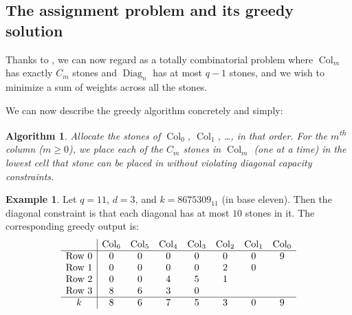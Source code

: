 \documentclass[11pt]{amsart}
\newtheorem{algorithm}[theorem]{Algorithm}
\theoremstyle{definition}
\newtheorem*{example}{Example}
\theoremstyle{remark}
\DeclareMathOperator{\Col}{Col}
\DeclareMathOperator{\Diag}{Diag}
\begin{document}
\subsection{The assignment problem and its greedy solution}
Thanks to ,
we can now regard  as a totally combinatorial problem
where $\Col_m$ has exactly $C_m$ stones
and $\Diag_n$ has at most $q-1$ stones,
and we wish to minimize a sum of weights across all the stones.

We can now describe the greedy algorithm concretely and simply:
\begin{algorithm}
  \label{alg:H1-greedy}
  Allocate the stones of $\Col_0$, $\Col_1$, \dots, in that order.
  For the $m$\textsuperscript{th} column ($m \ge 0$), we place each of the $C_m$ stones in $\Col_m$
  (one at a time) in the lowest cell that stone can be placed
  in without violating diagonal capacity constraints.
\end{algorithm}

\begin{example}
  Let $q = 11$, $d = 3$, and $k = 8675309_{11}$ (in base eleven).
  Then the diagonal constraint is that each diagonal has at most $10$ stones in it.
  The corresponding greedy output is:
  \[
    \begin{array}{c|ccc cccc}
      & \Col_6 & \Col_5 & \Col_4 & \Col_3 & \Col_2 & \Col_1 & \Col_0 \\ \hline
      \text{Row $0$} & 0 & 0 & 0 & 0 & 0 & 0 & 9 \\
      \text{Row $1$} & 0 & 0 & 0 & 0 & 2 & 0 \\
      \text{Row $2$} & 0 & 0 & 4 & 5 & 1 \\
      \text{Row $3$} & 8 & 6 & 3 & 0 \\ \hline
      k & 8 & 6 & 7 & 5 & 3 & 0 & 9
    \end{array}
  \]
\end{example}
\end{document}
